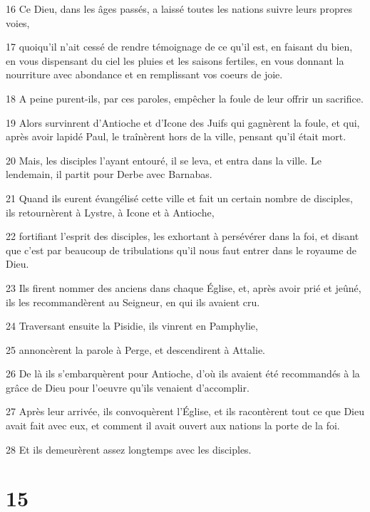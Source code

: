 \par 16 Ce Dieu, dans les âges passés, a laissé toutes les nations suivre leurs propres voies,
\par 17 quoiqu'il n'ait cessé de rendre témoignage de ce qu'il est, en faisant du bien, en vous dispensant du ciel les pluies et les saisons fertiles, en vous donnant la nourriture avec abondance et en remplissant vos coeurs de joie.
\par 18 A peine purent-ils, par ces paroles, empêcher la foule de leur offrir un sacrifice.
\par 19 Alors survinrent d'Antioche et d'Icone des Juifs qui gagnèrent la foule, et qui, après avoir lapidé Paul, le traînèrent hors de la ville, pensant qu'il était mort.
\par 20 Mais, les disciples l'ayant entouré, il se leva, et entra dans la ville. Le lendemain, il partit pour Derbe avec Barnabas.
\par 21 Quand ils eurent évangélisé cette ville et fait un certain nombre de disciples, ils retournèrent à Lystre, à Icone et à Antioche,
\par 22 fortifiant l'esprit des disciples, les exhortant à persévérer dans la foi, et disant que c'est par beaucoup de tribulations qu'il nous faut entrer dans le royaume de Dieu.
\par 23 Ils firent nommer des anciens dans chaque Église, et, après avoir prié et jeûné, ils les recommandèrent au Seigneur, en qui ils avaient cru.
\par 24 Traversant ensuite la Pisidie, ils vinrent en Pamphylie,
\par 25 annoncèrent la parole à Perge, et descendirent à Attalie.
\par 26 De là ils s'embarquèrent pour Antioche, d'où ils avaient été recommandés à la grâce de Dieu pour l'oeuvre qu'ils venaient d'accomplir.
\par 27 Après leur arrivée, ils convoquèrent l'Église, et ils racontèrent tout ce que Dieu avait fait avec eux, et comment il avait ouvert aux nations la porte de la foi.
\par 28 Et ils demeurèrent assez longtemps avec les disciples.

\chapter{15}

